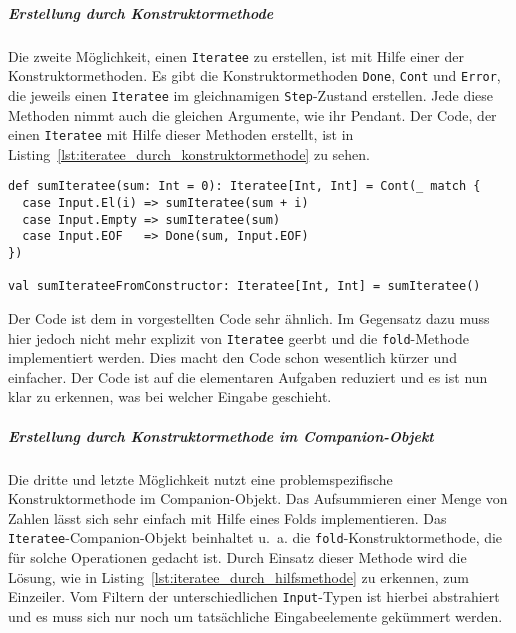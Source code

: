\documentclass[draft=false
              ,paper=a4
              ,twoside=false
              ,fontsize=11pt
              ,headsepline
              ,BCOR10mm
              ,DIV11
              ]{scrbook}
\begin{document}

\subparagraph{Erstellung durch Konstruktormethode} %
\label{subp:erstellung_durch_konstruktormethode}\mbox{} %

Die zweite Möglichkeit, einen \lstinline|Iteratee| zu erstellen, ist mit Hilfe einer der Konstruktormethoden.
Es gibt die Konstruktormethoden \lstinline|Done|, \lstinline|Cont| und \lstinline|Error|, die jeweils einen \lstinline|Iteratee| im gleichnamigen \lstinline|Step|-Zustand erstellen.
Jede diese Methoden nimmt auch die gleichen Argumente, wie ihr Pendant.
Der Code, der einen \lstinline|Iteratee| mit Hilfe dieser Methoden erstellt, ist in Listing~\ref{lst:iteratee_durch_konstruktormethode} zu sehen.

\begin{lstlisting}[caption=Erstellung eines Iteratees durch eine Konstruktormethode, label=lst:iteratee_durch_konstruktormethode]
def sumIteratee(sum: Int = 0): Iteratee[Int, Int] = Cont(_ match {
  case Input.El(i) => sumIteratee(sum + i)
  case Input.Empty => sumIteratee(sum)
  case Input.EOF   => Done(sum, Input.EOF)
})

val sumIterateeFromConstructor: Iteratee[Int, Int] = sumIteratee()
\end{lstlisting}

Der Code ist dem in  vorgestellten Code sehr ähnlich.
Im Gegensatz dazu muss hier jedoch nicht mehr explizit von \lstinline|Iteratee| geerbt und die \lstinline|fold|-Methode implementiert werden.
Dies macht den Code schon wesentlich kürzer und einfacher.
Der Code ist auf die elementaren Aufgaben reduziert und es ist nun klar zu erkennen, was bei welcher Eingabe geschieht.


\subparagraph{Erstellung durch Konstruktormethode im Companion-Objekt} %
\label{subp:erstellung_durch_hilfsmethode}\mbox{} %

Die dritte und letzte Möglichkeit nutzt eine problemspezifische Konstruktormethode im Companion-Objekt.
Das Aufsummieren einer Menge von Zahlen lässt sich sehr einfach mit Hilfe eines Folds implementieren.
Das \lstinline|Iteratee|-Companion-Objekt beinhaltet u.~a. die \lstinline|fold|-Konstruktormethode, die für solche Operationen gedacht ist.
Durch Einsatz dieser Methode wird die Lösung, wie in Listing~\ref{lst:iteratee_durch_hilfsmethode} zu erkennen, zum Einzeiler.
Vom Filtern der unterschiedlichen \lstinline|Input|-Typen ist hierbei abstrahiert und es muss sich nur noch um tatsächliche Eingabeelemente gekümmert werden.
\end{document}
